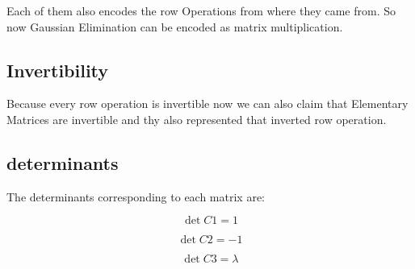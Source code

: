 Each of them also encodes the row Operations from where they came from.
So now Gaussian Elimination can be encoded as matrix multiplication.

\subsection{Invertibility}

Because every row operation is invertible now we can also claim that
Elementary Matrices are invertible and thy also represented that inverted row operation.


\subsection{determinants}

The determinants corresponding to each matrix are:

\[\det C1 = 1\]

\[\det C2 = -1\]

\[\det C3 = \lambda\]
